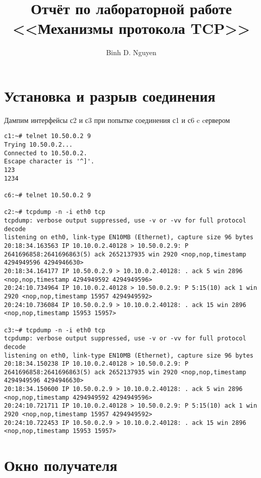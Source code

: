 \documentclass[a4paper,12pt]{article}
\title{Отчёт по лабораторной работе \\ <<Механизмы протокола TCP>>}
\author{Binh D. Nguyen}
\begin{document}
\maketitle

\tableofcontents


\section{Установка и разрыв соединения}

Дампим интерфейсы с2 и с3 при попытке соединения с1  и с6 c cервером

\begin{Verbatim}
c1:~# telnet 10.50.0.2 9
Trying 10.50.0.2...
Connected to 10.50.0.2.
Escape character is '^]'.
123
1234  

c6:~# telnet 10.50.0.2 9

c2:~# tcpdump -n -i eth0 tcp
tcpdump: verbose output suppressed, use -v or -vv for full protocol decode
listening on eth0, link-type EN10MB (Ethernet), capture size 96 bytes
20:18:34.163563 IP 10.10.0.2.40128 > 10.50.0.2.9: P 2641696858:2641696863(5) ack 2652137935 win 2920 <nop,nop,timestamp 4294949596 4294946630>
20:18:34.164177 IP 10.50.0.2.9 > 10.10.0.2.40128: . ack 5 win 2896 <nop,nop,timestamp 4294949592 4294949596>
20:24:10.734964 IP 10.10.0.2.40128 > 10.50.0.2.9: P 5:15(10) ack 1 win 2920 <nop,nop,timestamp 15957 4294949592>
20:24:10.736084 IP 10.50.0.2.9 > 10.10.0.2.40128: . ack 15 win 2896 <nop,nop,timestamp 15953 15957>

c3:~# tcpdump -n -i eth0 tcp
tcpdump: verbose output suppressed, use -v or -vv for full protocol decode
listening on eth0, link-type EN10MB (Ethernet), capture size 96 bytes
20:18:34.150238 IP 10.10.0.2.40128 > 10.50.0.2.9: P 2641696858:2641696863(5) ack 2652137935 win 2920 <nop,nop,timestamp 4294949596 4294946630>
20:18:34.150600 IP 10.50.0.2.9 > 10.10.0.2.40128: . ack 5 win 2896 <nop,nop,timestamp 4294949592 4294949596>
20:24:10.721711 IP 10.10.0.2.40128 > 10.50.0.2.9: P 5:15(10) ack 1 win 2920 <nop,nop,timestamp 15957 4294949592>
20:24:10.722453 IP 10.50.0.2.9 > 10.10.0.2.40128: . ack 15 win 2896 <nop,nop,timestamp 15953 15957>

\end{Verbatim}

\section{Окно получателя}
\end{document}

